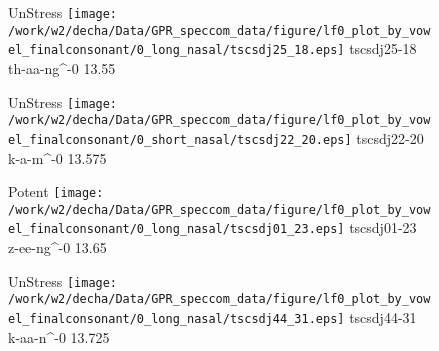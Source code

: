 \documentclass{article}
\begin{document}
\begin{figure}[t]
\begin{minipage}[b]{.24\textwidth}
UnStress
\centering
\texttt{[image: /work/w2/decha/Data/GPR\_speccom\_data/figure/lf0\_plot\_by\_vowel\_finalconsonant/0\_long\_nasal/tscsdj25\_18.eps]}
tscsdj25-18 th-aa-ng\textasciicircum-0 13.55
\end{minipage}
\begin{minipage}[b]{.24\textwidth}
UnStress
\centering
\texttt{[image: /work/w2/decha/Data/GPR\_speccom\_data/figure/lf0\_plot\_by\_vowel\_finalconsonant/0\_short\_nasal/tscsdj22\_20.eps]}
tscsdj22-20 k-a-m\textasciicircum-0 13.575
\end{minipage}
\begin{minipage}[b]{.24\textwidth}
\colorbox{Apricot}{Potent}
\centering
\texttt{[image: /work/w2/decha/Data/GPR\_speccom\_data/figure/lf0\_plot\_by\_vowel\_finalconsonant/0\_long\_nasal/tscsdj01\_23.eps]}
tscsdj01-23 z-ee-ng\textasciicircum-0 13.65
\end{minipage}
\begin{minipage}[b]{.24\textwidth}
UnStress
\centering
\texttt{[image: /work/w2/decha/Data/GPR\_speccom\_data/figure/lf0\_plot\_by\_vowel\_finalconsonant/0\_long\_nasal/tscsdj44\_31.eps]}
tscsdj44-31 k-aa-n\textasciicircum-0 13.725
\end{minipage}
\end{figure}
\end{document}
